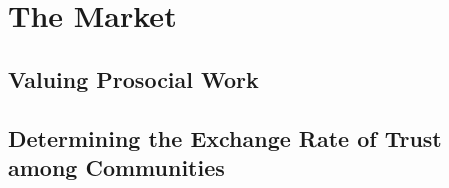 \section{\textbf{The Market}}

\subsection{Valuing Prosocial Work}

\subsection{Determining the Exchange Rate of Trust among Communities}

\newpage
\newpage

